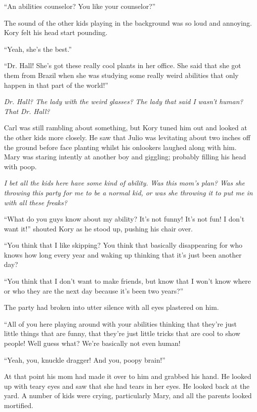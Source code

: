 ``An abilities counselor? You like your counselor?''

The sound of the other kids playing in the background was so loud and annoying. Kory felt his head start pounding.

``Yeah, she's the best.''

``Dr. Hall! She's got these really cool plants in her office. She said that she got them from Brazil when she was studying some really weird abilities that only happen in that part of the world!''

\textit{Dr. Hall? The lady with the weird glasses? The lady that said I wasn't human? That Dr. Hall?}

Carl was still rambling about something, but Kory tuned him out and looked at the other kids more closely. He saw that Julio was levitating about two inches off the ground before face planting whilst his onlookers laughed along with him. Mary was staring intently at another boy and giggling; probably filling his head with poop.

\textit{I bet all the kids here have some kind of ability. Was this mom's plan? Was she throwing this party for me to be a normal kid, or was she throwing it to put me in with all these freaks?}

``What do you guys know about my ability? It's not funny! It's not fun! I don't want it!'' shouted Kory as he stood up, pushing his chair over.

``You think that I like skipping? You think that basically disappearing for who knows how long every year and waking up thinking that it's just been another day?

``You think that I don't want to make friends, but know that I won't know where or who they are the next day because it's been two years?''

The party had broken into utter silence with all eyes plastered on him.

``All of you here playing around with your abilities thinking that they're just little things that are funny, that they're just little tricks that are cool to show people! Well guess what? We're basically not even human!

``Yeah, you, knuckle dragger! And you, poopy brain!''

At that point his mom had made it over to him and grabbed his hand. He looked up with teary eyes and saw that she had tears in her eyes. He looked back at the yard. A number of kids were crying, particularly Mary, and all the parents looked mortified.

